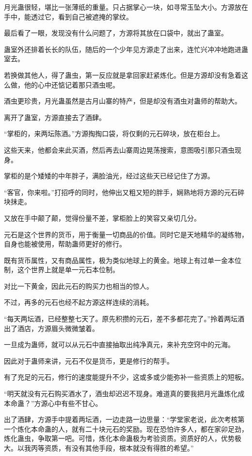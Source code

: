 \begin{this_body}
月光蛊很轻，堪比一张薄纸的重量。只占据掌心一块，如寻常玉坠大小。方源放在手中，能透过它，看到自己被遮掩的掌纹。

最后看了一眼，发现没有什么问题了，方源将其放在口袋中，就出了蛊室。

蛊室外还排着长长的队伍，随后的一个少年见方源走了出来，连忙兴冲冲地跑进蛊室去。

若换做其他人，得了蛊虫，第一反应就是拿回家赶紧炼化。但是方源却没有急着这么做，他的心中还惦记着那只酒虫呢。

酒虫更珍贵，月光蛊虽然是古月山寨的特产，但是却没有酒虫对蛊师的帮助大。

离开了蛊室，方源直接去了酒肆。

“掌柜的，来两坛陈酒。”方源掏掏口袋，将仅剩的元石碎块，放在柜台上。

这些天来，他都会来此买酒，然后再去山寨周边晃荡搜索，意图吸引那只酒虫现身。

掌柜的是个矮矮的中年胖子，满脸油光，经过这些天已经记住了方源。

“客官，你来啦。”打招呼的同时，他伸出又粗又短的胖手，娴熟地将方源的元石碎块抹走。

又放在手中颠了颠，觉得份量不差，掌柜脸上的笑容又亲切几分。

元石是这个世界的货币，用于衡量一切商品的价值。同时它是天地精华的凝练物，自身也能被使用，帮助蛊师更好的修行。

既有货币属性，又有商品属性，极为类似地球上的黄金。地球上有过单一金本位制，这个世界上就是单一元石本位制。

对比一下黄金，因此元石的购买力也相当的惊人。

不过，再多的元石也经不起方源这样连续的消耗。

“每天两坛酒，已经整整七天了。原先积攒的元石，差不多都花完了。”拎着两坛酒出了酒店，方源眉头微微皱着。

一旦成为蛊师，就可以从元石中直接抽取出纯净真元，来补充空窍中的元海。

因此对于蛊师来讲，元石不仅是货币，更是修行的帮手。

有了充足的元石，修行的速度能提升不少，这或多或少能弥补一些资质上的短板。

“明天就没有元石购买酒水了，酒虫却迟迟不现身。难道真的要我把月光蛊炼化成本命蛊？”方源心中有些不甘心。

出了酒肆，方源手中提着两坛酒，一边走路一边思量：“学堂家老说，此次考核第一个炼化本命蛊的人，就有二十块元石的奖励。现在恐怕许多人，都在家卯足劲，炼化蛊虫，争取第一吧。可惜，炼化本命蛊极为考验资质。资质好的人，优势极大。以我丙等资质，有没有其他手段，根本就没有得胜的希望。”


\end{this_body}
